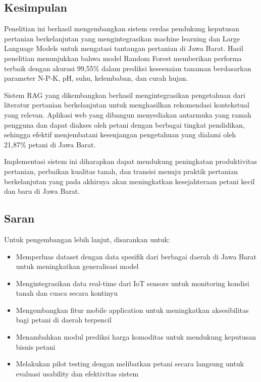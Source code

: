\documentclass{article} %
\begin{document}
\subsection{Kesimpulan}

Penelitian ini berhasil mengembangkan sistem cerdas pendukung keputusan pertanian berkelanjutan yang mengintegrasikan machine learning dan Large Language Models untuk mengatasi tantangan pertanian di Jawa Barat. Hasil penelitian menunjukkan bahwa model Random Forest memberikan performa terbaik dengan akurasi 99,55\% dalam prediksi kesesuaian tanaman berdasarkan parameter N-P-K, pH, suhu, kelembaban, dan curah hujan.

Sistem RAG yang dikembangkan berhasil mengintegrasikan pengetahuan dari literatur pertanian berkelanjutan untuk menghasilkan rekomendasi kontekstual yang relevan. Aplikasi web yang dibangun menyediakan antarmuka yang ramah pengguna dan dapat diakses oleh petani dengan berbagai tingkat pendidikan, sehingga efektif menjembatani kesenjangan pengetahuan yang dialami oleh 21,87\% petani di Jawa Barat.

Implementasi sistem ini diharapkan dapat mendukung peningkatan produktivitas pertanian, perbaikan kualitas tanah, dan transisi menuju praktik pertanian berkelanjutan yang pada akhirnya akan meningkatkan kesejahteraan petani kecil dan baru di Jawa Barat.

\subsection{Saran}

Untuk pengembangan lebih lanjut, disarankan untuk:

\begin{itemize}
    \item Memperluas dataset dengan data spesifik dari berbagai daerah di Jawa Barat untuk meningkatkan generalisasi model
    \item Mengintegrasikan data real-time dari IoT sensors untuk monitoring kondisi tanah dan cuaca secara kontinyu
    \item Mengembangkan fitur mobile application untuk meningkatkan aksesibilitas bagi petani di daerah terpencil
    \item Menambahkan modul prediksi harga komoditas untuk mendukung keputusan bisnis petani
    \item Melakukan pilot testing dengan melibatkan petani secara langsung untuk evaluasi usability dan efektivitas sistem
\end{itemize}
\end{document}
